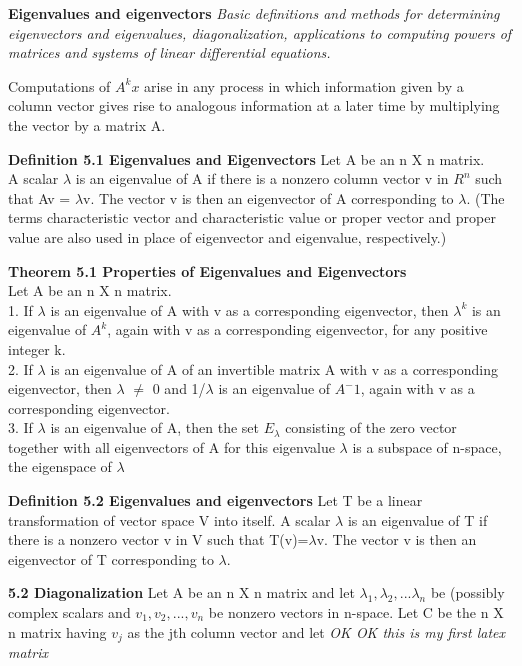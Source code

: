 \documentclass{article}
\begin{document}
	\textbf {Eigenvalues and eigenvectors} \textit {Basic definitions and methods for determining eigenvectors and eigenvalues, diagonalization, applications to computing powers of matrices and systems of linear differential equations.}

Computations of $A^kx$ arise in any process in which information given by a column vector gives rise to analogous information at a later time by multiplying the vector by a matrix A.

\textbf {Definition 5.1 Eigenvalues and Eigenvectors} Let A be an n X n matrix. \\
 A scalar $\lambda$ is an eigenvalue of A if there is a nonzero column vector v in $R^n$ such that Av = $\lambda$v. The vector v is then an eigenvector of A corresponding to $\lambda$. (The terms characteristic vector and characteristic value or proper vector and proper value are also used in place of eigenvector and eigenvalue, respectively.)

\textbf {Theorem 5.1 Properties of Eigenvalues and Eigenvectors} 
\\
Let A be an n X n matrix.
\\
1. If $\lambda$ is an eigenvalue of A with v as a corresponding eigenvector, then $\lambda^k$ is an eigenvalue of $A^k$, again with v as a corresponding eigenvector, for any positive integer k.
\\
2. If $\lambda$ is an eigenvalue of A of an invertible matrix A with v as a corresponding eigenvector, then $\lambda$ $\neq$ 0 and 1/$\lambda$ is an eigenvalue of $A^-1$, again with v as a corresponding eigenvector.
\\
3. If $\lambda$ is an eigenvalue of A, then the set $E_\lambda$ consisting of the zero vector together with all eigenvectors of A for this eigenvalue $\lambda$ is a subspace of n-space, the eigenspace of $\lambda$

\textbf{Definition 5.2 Eigenvalues and eigenvectors}
Let T be a linear transformation of vector space V into itself. A scalar $\lambda$ is an eigenvalue of T if there is a nonzero vector v in V such that T(v)=$\lambda$v. The vector v is then an eigenvector of T corresponding to $\lambda$.

\textbf {5.2 Diagonalization}
Let A be an n X n matrix and let $\lambda_1, \lambda_2,...\lambda_n$ be (possibly complex scalars and $v_1, v_2,..., v_n$ be nonzero vectors in n-space. Let C be the n X n matrix having $v_j$ as the jth column vector and let 
\textit{OK OK this is my first latex matrix}
\end{document}
